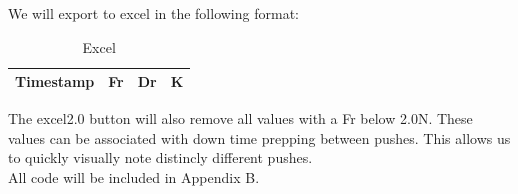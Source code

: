 \documentclass[pdftex,11pt,letterpaper]{article}
\begin{document}
We will export to excel in the following format:

\begin{table}[h!]
\begin{center}
    \begin{tabular}{ | l | l | l | l |}
    \hline
    Timestamp & Fr & Dr & K \\ \hline
	\end{tabular}
	\caption{Excel}
\end{center}
\end{table}

The excel2.0 button will also remove all values with a Fr below 2.0N. These values can be associated with down time prepping between pushes. This allows us to quickly visually note distincly different pushes. \\

All code will be included in Appendix B. 

\pagebreak
\begin{appendices}



\end{appendices}
\pagebreak
\end{document}

